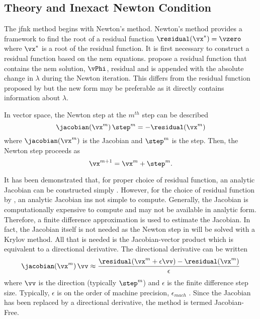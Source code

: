   \subsection{ Theory and Inexact Newton Condition}
    The \gls{jfnk} method begins with Newton's method. Newton's method provides
    a framework to find the root of a residual function 
    $\residual(\vx^*) = \vzero$ where $\vx^*$ is a root of the residual 
    function. It is first necessary to construct a residual function based on
    the \gls{nem} equations. \citeauthor{qe2paper} propose a residual function
    that contains the \gls{nem} solution, $\vPhi$, residual and is appended with
    the absolute change in $\lambda$ during the Newton iteration. This differs
    from the residual function proposed by \citeauthor{gill_azmy} but the new
    form may be preferable as it directly contains information about $\lambda$.
    
    In vector space, the Newton step at the $m^{th}$ step can be described 
    \begin{equation}
      \label{eq:newton_step}
      \jacobian (\vx^m) \, \step^m = - \residual(\vx^m)
    \end{equation}
    where $\jacobian(\vx^m)$ is the Jacobian and $\step^m$ is the step. Then,
    the Newton step proceeds as
    \begin{equation}
      \vx^{m+1} = \vx^{m} + \step^{m}.
    \end{equation}

    It has been demonstrated that, for proper choice of residual function, an
    analytic Jacobian can be constructed simply \cite{gill_azmy}. However, for
    the choice of residual function by \citeauthor{qe2paper}, an analytic
    Jacobian ins not simple to compute. Generally, the Jacobian is
    computationally expensive to compute and may not be available in analytic
    form. Therefore, a finite difference approximation is used to estimate the
    Jacobian. In fact, the Jacobian itself is not needed as the Newton step in
     will be solved with a Krylov method. All that is
    needed is the Jacobian-vector product which is equivalent to a directional
    derivative. The directional derivative can be written
    \begin{equation}
      \label{eq:dirder}
      \jacobian(\vx^m) \, \vv \approx \frac{\residual(\vx^m + \epsilon \vv) - 
        \residual(\vx^m)}{\epsilon}
    \end{equation}
    where $\vv$ is the direction (typically $\step^m$) and $\epsilon$ is the
    finite difference step size. Typically, $\epsilon$ is on the order of
    machine precision, $\epsilon_{mach}$
    \cite{qe2paper,gill_azmy,textbookkelley}. Since the Jacobian has been
    replaced by a directional derivative, the method is termed Jacobian-Free.

